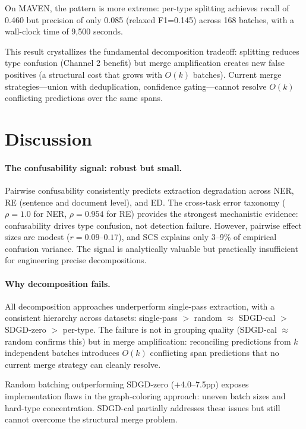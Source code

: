 \documentclass[11pt,a4paper]{article}
\begin{document}
On MAVEN, the pattern is more extreme: per-type splitting achieves recall of 0.460 but precision of only 0.085 (relaxed F1=0.145) across 168 batches, with a wall-clock time of 9,500 seconds.

This result crystallizes the fundamental decomposition tradeoff: splitting reduces type confusion (Channel 2 benefit) but merge amplification creates new false positives (a structural cost that grows with $O(k)$ batches). Current merge strategies---union with deduplication, confidence gating---cannot resolve $O(k)$ conflicting predictions over the same spans.

\section{Discussion}

\paragraph{The confusability signal: robust but small.}
Pairwise confusability consistently predicts extraction degradation across NER, RE (sentence and document level), and ED. The cross-task error taxonomy ($\rho{=}1.0$ for NER, $\rho{=}0.954$ for RE) provides the strongest mechanistic evidence: confusability drives type confusion, not detection failure. However, pairwise effect sizes are modest ($r{=}0.09$--$0.17$), and SCS explains only 3--9\% of empirical confusion variance. The signal is analytically valuable but practically insufficient for engineering precise decompositions.

\paragraph{Why decomposition fails.}
All decomposition approaches underperform single-pass extraction, with a consistent hierarchy across datasets: single-pass $>$ random $\approx$ SDGD-cal $>$ SDGD-zero $>$ per-type. The failure is not in grouping quality (SDGD-cal $\approx$ random confirms this) but in merge amplification: reconciling predictions from $k$ independent batches introduces $O(k)$ conflicting span predictions that no current merge strategy can cleanly resolve.

Random batching outperforming SDGD-zero ($+$4.0--7.5pp) exposes implementation flaws in the graph-coloring approach: uneven batch sizes and hard-type concentration. SDGD-cal partially addresses these issues but still cannot overcome the structural merge problem.
\end{document}

